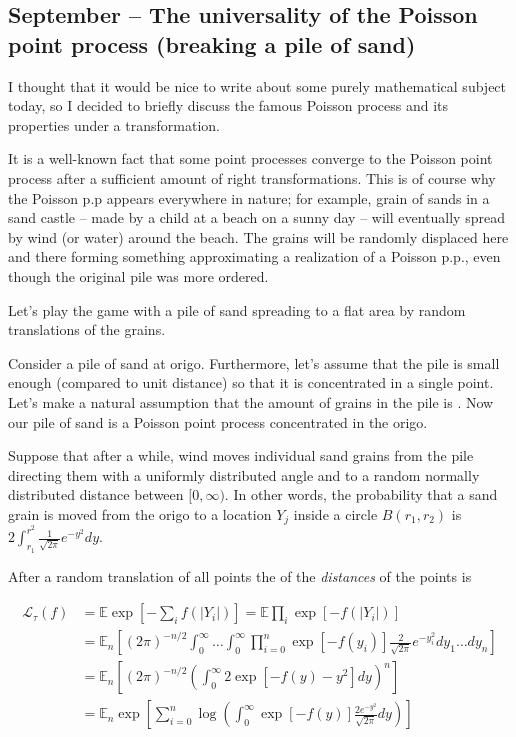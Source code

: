 \documentclass{article}
\begin{document}
\subsection{September – The universality of the Poisson point process (breaking a pile of sand)}


I thought that it would be nice to write about some purely mathematical subject today, so I decided to briefly discuss the famous Poisson process and its properties under a transformation.

It is a well-known fact that some point processes converge to the Poisson point process after a sufficient amount of right transformations. This is of course why the Poisson p.p appears everywhere in nature; for example, grain of sands in a sand castle – made by a child at a beach on a sunny day – will eventually spread by wind (or water) around the beach. The grains will be randomly displaced here and there forming something approximating a realization of a Poisson p.p., even though the original pile was more ordered.

Let's play the game with a pile of sand spreading to a flat area by random translations of the grains. 

Consider a pile of sand at origo. Furthermore, let's assume that the pile is small enough (compared to unit distance) so that it is concentrated in a single point. Let's make a natural assumption that the amount of grains in the pile is  . Now our pile of sand is a Poisson point process concentrated in the origo.

Suppose that after a while, wind moves individual sand grains from the pile directing them with a uniformly distributed angle and to a random normally distributed distance between $[0, \infty)$. In other words, the probability that a sand grain is moved from the origo to a location $Y_j$ inside a circle $B(r_1,r_2)$ is $2\int_{r_1}^{r^2} \frac{1}{\sqrt{2 \pi}}e^{-y^2} dy.$ 
  
  After a random translation of all points the  of the \textit{distances} of the points is 

  \begin{align*}
    \mathcal{L}_{\tau}(f) &= \mathbb{E} \exp \left[-\sum_i f(|Y_i|) \right] = \mathbb{E}  \prod_i \exp \left[  -f(|Y_i|)   \right]  \\
    &= \mathbb{E}_n \left[  (2 \pi)^{-n/2}  \int_0^{\infty} \dots \int_0^{\infty}  \prod_{i = 0}^n \exp \left[  -f(y_i)  \right] \frac{2}{\sqrt{2 \pi}}e^{-y_i^2} dy_1 \dots d y_n \right] \\
    &= \mathbb{E}_n \left[(2 \pi)^{-n/2}  \left( \int_{0}^{\infty}  2\exp \left[  -f(y) - y^2   \right] dy \right)^n\right] \\
    &= \mathbb{E}_n \exp \left[ \sum_{i= 0}^n \log \left(   \int_{0}^{\infty}  \exp \left[  -f(y)  \right] \frac{2e^{-y^2}}{\sqrt{2 \pi}} dy \right) \right] \\ 
  \end{align*}
\end{document}
